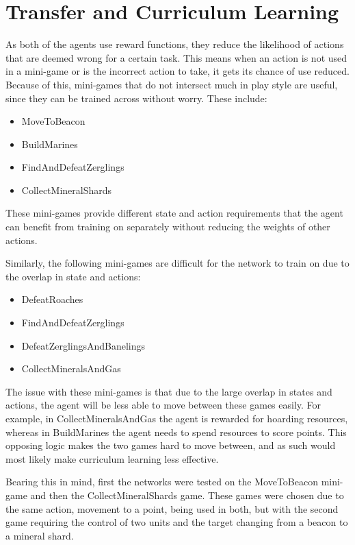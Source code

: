 \section{Transfer and Curriculum Learning}

As both of the agents use reward functions, they reduce the likelihood of
actions that are deemed wrong for a certain task. This means when an action is
not used in a mini-game or is the incorrect action to take, it gets its chance
of use reduced. Because of this, mini-games that do not intersect much in
play style are useful, since they can be trained across without worry. These
include:

\begin{itemize}
    \item MoveToBeacon
    \item BuildMarines
    \item FindAndDefeatZerglings
    \item CollectMineralShards
\end{itemize}

These mini-games provide different state and action requirements that the
agent can benefit from training on separately without reducing the weights of
other actions.

Similarly, the following mini-games are difficult for the network to train on
due to the overlap in state and actions:

\begin{itemize}
    \item DefeatRoaches
    \item FindAndDefeatZerglings
    \item DefeatZerglingsAndBanelings
    \item CollectMineralsAndGas
\end{itemize}

The issue with these mini-games is that due to the large overlap in states and
actions, the agent will be less able to move between these games easily. For
example, in CollectMineralsAndGas the agent is rewarded for hoarding resources,
whereas in BuildMarines the agent needs to spend resources to score points. This
opposing logic makes the two games hard to move between, and as such would most
likely make curriculum learning less effective.

Bearing this in mind, first the networks were tested on the MoveToBeacon
mini-game and then the CollectMineralShards game. These games were chosen due to
the same action, movement to a point, being used in both, but with the second
game requiring the control of two units and the target changing from a beacon to
a mineral shard.

